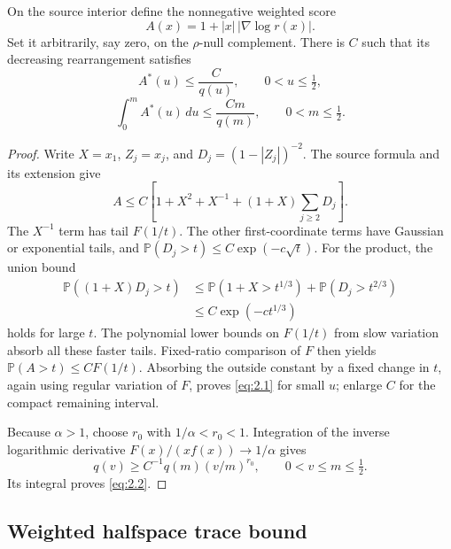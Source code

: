 On the source interior define the nonnegative weighted score
\[
  A(x)=1+|x|\,|\nabla\log r(x)|.
\]
Set it arbitrarily, say zero, on the $\rho$-null complement. There is $C$ such that its decreasing rearrangement satisfies
\begin{equation}
  A^*(u)\le\frac{C}{q(u)},\qquad 0<u\le\tfrac12,
  \tag{2.1}\label{eq:2.1}
\end{equation}
\begin{equation}
  \int_0^m A^*(u)\,du\le\frac{Cm}{q(m)},
  \qquad 0<m\le\tfrac12.
  \tag{2.2}\label{eq:2.2}
\end{equation}
\begin{proof}
Write $X=x_1$, $Z_j=x_j$, and $D_j=(1-|Z_j|)^{-2}$. The source formula and its extension give
\begin{equation}
  A\le C\left[1+X^2+X^{-1}+(1+X)\sum_{j\ge2}D_j\right].
  \tag{2.3}\label{eq:2.3}
\end{equation}
The $X^{-1}$ term has tail $F(1/t)$. The other first-coordinate terms have Gaussian or exponential tails, and $\mathbb P(D_j>t)\le C\exp(-c\sqrt t)$. For the product, the union bound
\[
  \begin{aligned}
  \mathbb P((1+X)D_j>t)
  &\le\mathbb P(1+X>t^{1/3})+\mathbb P(D_j>t^{2/3})\\
  &\le C\exp(-ct^{1/3})
  \end{aligned}
\]
holds for large $t$. The polynomial lower bounds on $F(1/t)$ from slow variation absorb all these faster tails. Fixed-ratio comparison of $F$ then yields $\mathbb P(A>t)\le CF(1/t)$. Absorbing the outside constant by a fixed change in $t$, again using regular variation of $F$, proves \eqref{eq:2.1} for small $u$; enlarge $C$ for the compact remaining interval.

Because $\alpha>1$, choose $r_0$ with $1/\alpha<r_0<1$. Integration of the inverse logarithmic derivative $F(x)/(xf(x))\longrightarrow1/\alpha$ gives
\[
  q(v)\ge C^{-1}q(m)(v/m)^{r_0},
  \qquad 0<v\le m\le\tfrac12.
\]
Its integral proves \eqref{eq:2.2}.
\end{proof}

\subsection{Weighted halfspace trace bound}


